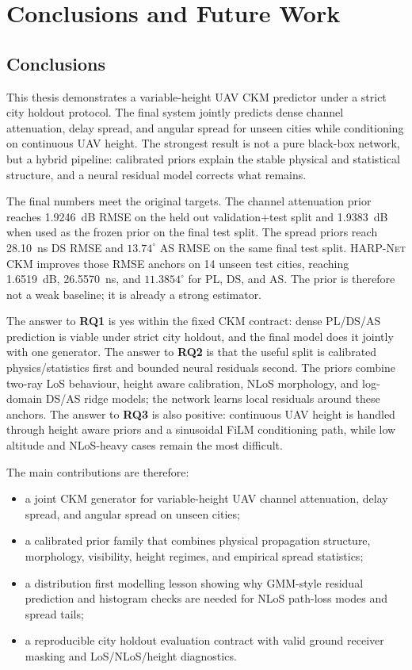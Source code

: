 \chapter{Conclusions and Future Work}

\section{Conclusions}

This thesis demonstrates a variable-height UAV CKM predictor under a strict
city holdout protocol. The final system jointly predicts dense channel attenuation, delay
spread, and angular spread for unseen cities while conditioning on continuous
UAV height. The strongest result is not a pure black-box network, but a hybrid
pipeline: calibrated priors explain the stable physical and statistical
structure, and a neural residual model corrects what remains.

The final numbers meet the original targets. The channel attenuation prior reaches
\SI{1.9246}{dB} RMSE on the held out validation+test split and
\SI{1.9383}{dB} when used as the frozen prior on the final test split. The spread priors reach
\SI{28.10}{ns} DS RMSE and \(13.74^\circ\) AS RMSE on the same final test
split. \textsc{HARP-Net CKM} improves those RMSE anchors on 14
unseen test cities, reaching
\SI{1.6519}{dB}, \SI{26.5570}{ns}, and \(11.3854^\circ\) for PL, DS, and AS.
The prior is therefore not a weak baseline; it is already a strong estimator.

The answer to \textbf{RQ1} is yes within the fixed CKM contract: dense PL/DS/AS
prediction is viable under strict city holdout, and the final model does it
jointly with one generator. The answer to \textbf{RQ2} is that the useful split
is calibrated physics/statistics first and bounded neural residuals second. The
priors combine two-ray LoS behaviour, height aware calibration, NLoS morphology,
and log-domain DS/AS ridge models; the network learns local residuals around
these anchors. The answer to \textbf{RQ3} is also positive: continuous UAV
height is handled through height aware priors and a sinusoidal FiLM conditioning
path, while low altitude and NLoS-heavy cases remain the most difficult.

The main contributions are therefore:
\begin{itemize}
  \item a joint CKM generator for variable-height UAV channel attenuation, delay spread,
        and angular spread on unseen cities;
  \item a calibrated prior family that combines physical propagation structure,
        morphology, visibility, height regimes, and empirical spread statistics;
  \item a distribution first modelling lesson showing why GMM-style residual
        prediction and histogram checks are needed for NLoS path-loss modes and
        spread tails;
  \item a reproducible city holdout evaluation contract with valid ground
        receiver masking and LoS/NLoS/height diagnostics.
\end{itemize}

